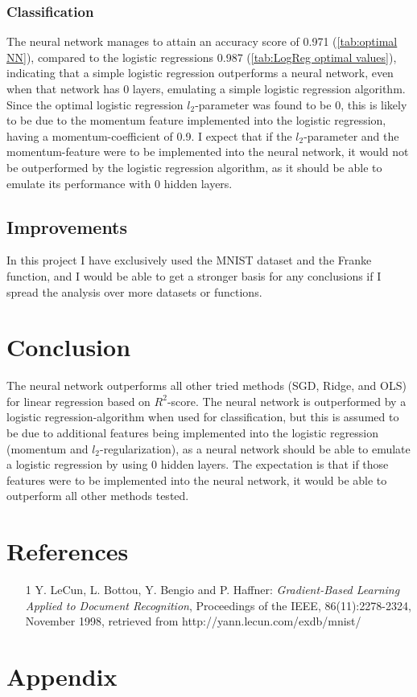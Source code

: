 \documentclass[a4paper, UKenglish]{article}
\newcommand{\0}{\mathbf{0}}
\newcommand{\1}{\mathbf{1}}
\begin{document}
\subsubsection{Classification}
The neural network manages to attain an accuracy score of 0.971 (\autoref{tab:optimal NN}), compared to the logistic regressions 0.987 (\autoref{tab:LogReg optimal values}), indicating that a simple logistic regression outperforms a neural network, even when that network has 0 layers, emulating a simple logistic regression algorithm. Since the optimal logistic regression $l_2$-parameter was found to be 0, this is likely to be due to the momentum feature implemented into the logistic regression, having a momentum-coefficient of 0.9. I expect that if the $l_2$-parameter and the momentum-feature were to be implemented into the neural network, it would not be outperformed by the logistic regression algorithm, as it should be able to emulate its performance with 0 hidden layers.

\subsection{Improvements}
In this project I have exclusively used the MNIST dataset and the Franke function, and I would be able to get a stronger basis for any conclusions if I spread the analysis over more datasets or functions.


\section{Conclusion}
The neural network outperforms all other tried methods (SGD, Ridge, and OLS) for linear regression based on $R^2$-score. The neural network is outperformed by a logistic regression-algorithm when used for classification, but this is assumed to be due to additional features being implemented into the logistic regression (momentum and $l_2$-regularization), as a neural network should be able to emulate a logistic regression by using 0 hidden layers. The expectation is that if those features were to be implemented into the neural network, it would be able to outperform all other methods tested.

\section{References}
\begin{itemize}
\item [1] Y. LeCun, L. Bottou, Y. Bengio and P. Haffner: \textit{Gradient-Based Learning Applied to Document Recognition}, Proceedings of the IEEE, 86(11):2278-2324, November 1998, retrieved from http://yann.lecun.com/exdb/mnist/
\end{itemize}


\section{Appendix}
\end{document}
